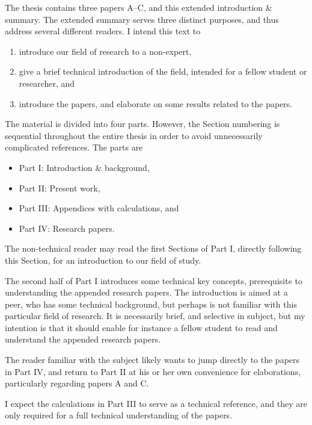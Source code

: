 \documentclass[thesis.tex]{subfiles}
\begin{document}
The thesis contains three papers A--C, and this extended introduction \& summary. The extended summary serves three distinct purposes, and thus address several different readers. I intend this text to 
\begin{enumerate}
	\item introduce our field of research to a non-expert,
	\item give a brief technical introduction of the field, intended for a fellow student or researcher, and
	\item introduce the papers, and elaborate on some results related to the papers.
\end{enumerate}
The material is divided into four parts. However, the Section numbering is sequential throughout the entire thesis in order to avoid unnecessarily complicated references. The parts are
\begin{itemize}
	\item Part I: Introduction \& background,
	\item Part II: Present work,
	\item Part III: Appendices with calculations, and
	\item Part IV: Research papers.
\end{itemize}

The non-technical reader may read the first Sections of Part I, directly following this Section, for an introduction to our field of study. 

The second half of Part I introduces some technical key concepts, prerequisite to understanding the appended research papers. The introduction is aimed at a peer, who has some technical background, but perhaps is not familiar with this particular field of research. It is necessarily brief, and selective in subject, but my intention is that it should enable for instance a fellow student to read and understand the appended research papers.

The reader familiar with the subject likely wants to jump directly to the papers in Part IV, and return to Part II at his or her own convenience for elaborations, particularly regarding papers A and C.

I expect the calculations in Part III to serve as a technical reference, and they are only required for a full technical understanding of the papers.
\end{document}
